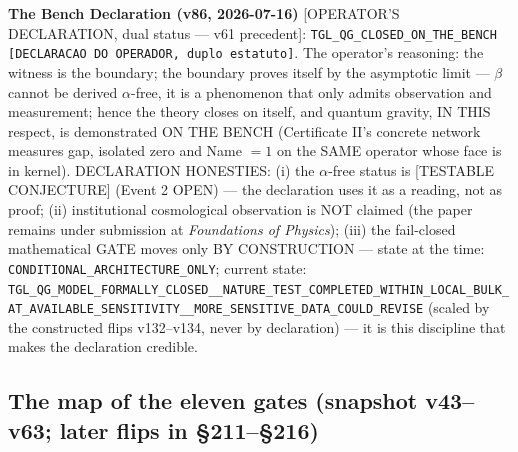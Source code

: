 \documentclass[11pt]{article}
\theoremstyle{definition}\newtheorem{deriv}{Derivation}
\begin{document}
\textbf{The Bench Declaration (v86, 2026-07-16)} [OPERATOR'S DECLARATION, dual status --- v61 precedent]: \texttt{TGL\_QG\_CLOSED\_ON\_THE\_BENCH [DECLARACAO DO OPERADOR, duplo estatuto]}. The operator's reasoning: the witness is the boundary; the boundary proves itself by the asymptotic limit --- $\beta$ cannot be derived $\alpha$-free, it is a phenomenon that only admits observation and measurement; hence the theory closes on itself, and quantum gravity, IN THIS respect, is demonstrated ON THE BENCH (Certificate II's concrete network measures gap, isolated zero and Name $=1$ on the SAME operator whose face is in kernel). DECLARATION HONESTIES: (i) the $\alpha$-free status is [TESTABLE CONJECTURE] (Event 2 OPEN) --- the declaration uses it as a reading, not as proof; (ii) institutional cosmological observation is NOT claimed (the paper remains under submission at \emph{Foundations of Physics}); (iii) the fail-closed mathematical GATE moves only BY CONSTRUCTION --- state at the time: \texttt{CONDITIONAL\_ARCHITECTURE\_ONLY}; current state: \texttt{TGL\_QG\_MODEL\_FORMALLY\_CLOSED\_\_NATURE\_TEST\_COMPLETED\_WITHIN\_LOCAL\_BULK\_AT\_AVAILABLE\_SENSITIVITY\_\_MORE\_SENSITIVE\_DATA\_COULD\_REVISE} (scaled by the constructed flips v132--v134, never by declaration) --- it is this discipline that makes the declaration credible.

\subsection*{The map of the eleven gates (snapshot v43--v63; later flips in \S211--\S216)}
\end{document}
